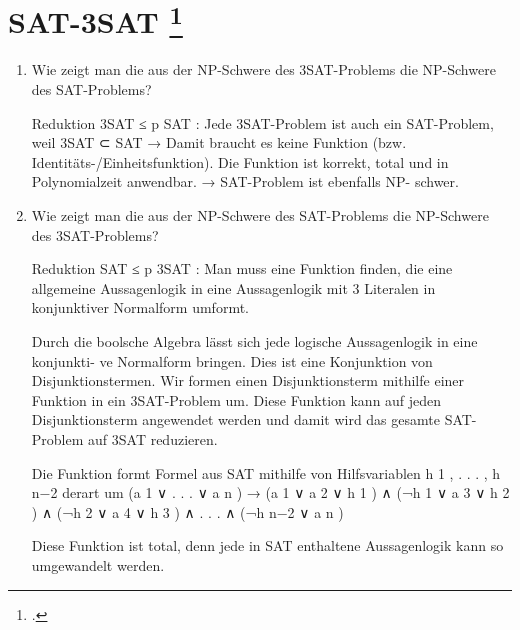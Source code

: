 \documentclass{lehramt-informatik-aufgabe}
\begin{document}
\section{SAT-3SAT
\footcite[Seite 18, Aufgabe 14]{theo:ab:4}}

\begin{enumerate}


\item Wie zeigt man die aus der NP-Schwere des 3SAT-Problems die NP-Schwere des
SAT-Problems?

\begin{liAntwort}
Reduktion 3SAT ≤ p SAT : Jede 3SAT-Problem ist auch ein SAT-Problem,
weil 3SAT ⊂ SAT → Damit braucht es keine Funktion (bzw.
Identitäts-/Einheitsfunktion). Die Funktion ist korrekt, total und in
Polynomialzeit anwendbar. → SAT-Problem ist ebenfalls NP- schwer.
\end{liAntwort}


\item Wie zeigt man die aus der NP-Schwere des SAT-Problems die NP-Schwere des
3SAT-Problems?

\begin{liAntwort}
Reduktion SAT ≤ p 3SAT : Man muss eine Funktion ﬁnden, die eine
allgemeine Aussagenlogik in eine Aussagenlogik mit 3 Literalen in
konjunktiver Normalform umformt.

Durch die boolsche Algebra lässt sich jede logische Aussagenlogik in
eine konjunkti- ve Normalform bringen. Dies ist eine Konjunktion von
Disjunktionstermen. Wir formen einen Disjunktionsterm mithilfe einer
Funktion in ein 3SAT-Problem um. Diese Funktion kann auf jeden
Disjunktionsterm angewendet werden und damit wird das gesamte
SAT-Problem auf 3SAT reduzieren.

Die Funktion formt Formel aus SAT mithilfe von Hilfsvariablen h 1 , . .
. , h n−2 derart um (a 1 ∨ . . . ∨ a n ) → (a 1 ∨ a 2 ∨ h 1 ) ∧ (¬h 1 ∨
a 3 ∨ h 2 ) ∧ (¬h 2 ∨ a 4 ∨ h 3 ) ∧ . . . ∧ (¬h n−2 ∨ a n )

Diese Funktion ist total, denn jede in SAT enthaltene Aussagenlogik kann
so umgewandelt werden.


\end{liAntwort}
\end{enumerate}
\end{document}

